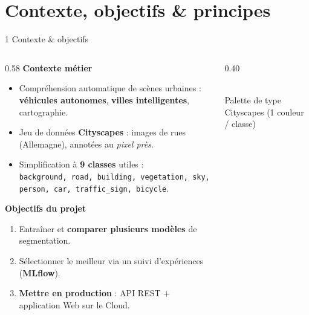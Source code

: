 \documentclass[aspectratio=169,11pt]{beamer}
\newcommand{\emphc}[1]{\textbf{\color{cvblue}#1}}
\newcommand{\code}[1]{\texttt{\small #1}}
\begin{document}
\section{Contexte, objectifs \& principes}
\begin{frame}{1 \textbar{} Contexte \& objectifs}
  \begin{columns}[T]
    \begin{column}{0.58\textwidth}
      \textbf{Contexte métier}
      \begin{itemize}
        \item Compréhension automatique de scènes urbaines :
          \emphc{véhicules autonomes}, \emphc{villes intelligentes}, cartographie.
        \item Jeu de données \emphc{Cityscapes} : images de rues (Allemagne),
          annotées au \emph{pixel près}.
        \item Simplification à \emphc{9 classes} utiles :\\
          \footnotesize \code{background, road, building, vegetation, sky,
          person, car, traffic\_sign, bicycle}.
      \end{itemize}
      \vspace{0.4em}
      \textbf{Objectifs du projet}
      \begin{enumerate}
        \item Entraîner et \emphc{comparer plusieurs modèles} de segmentation.
        \item Sélectionner le meilleur via un suivi d'expériences (\emphc{MLflow}).
        \item \emphc{Mettre en production} : API REST + application Web sur le Cloud.
      \end{enumerate}
    \end{column}
    \begin{column}{0.40\textwidth}
      \centering
      \\[0.3em]
      {\footnotesize Palette de type Cityscapes (1 couleur / classe)}
    \end{column}
  \end{columns}
\end{frame}
\end{document}
